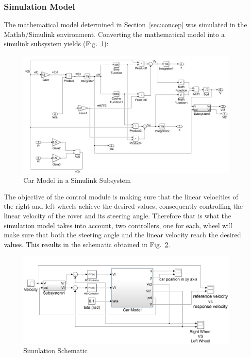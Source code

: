 \subsubsection{Simulation Model}
The mathematical model determined in Section~\ref{sec:concep} was simulated in
the Matlab/Simulink environment. Converting the mathematical model into a
simulink subsystem yields (Fig.~\ref{fig:carModel}):
\begin{figure}[!htbp]
\centering
       \includegraphics[page=1,width=1\textwidth]{img/subsystem.png} 
\caption{Car Model in a Simulink Subsystem}
\label{fig:carModel}
\end{figure}
The objective of the control module is making sure that the linear velocities of the right and left wheels achieve the desired values, consequently controlling the linear velocity of the rover and its steering angle. Therefore that is what the simulation model takes into account, two controllers, one for each, wheel will make sure that both the steeting angle and the linear velocity reach the desired values. This results in the schematic obtained in Fig.~\ref{fig:simSche}.
\begin{figure}[!htbp]
\centering
       \includegraphics[page=1,width=1\textwidth]{img/system.png} 
\caption{Simulation Schematic}
\label{fig:simSche}
\end{figure}\\